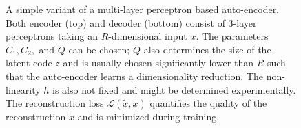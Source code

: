 \documentclass[twoside,11pt,a4paper]{article}
\begin{document}
\begin{figure}
  \caption{A simple variant of a multi-layer perceptron based auto-encoder.
  Both encoder (top) and decoder (bottom) consist of 3-layer perceptrons
  taking an $R$-dimensional
  input $x$. The parameters $C_1, C_2,$ and $Q$ can be chosen; $Q$ also
  determines the size of the latent code $z$ and is usually chosen significantly
  lower than $R$ such that the auto-encoder learns a dimensionality reduction.
  The non-linearity $h$ is also not fixed and might be determined experimentally.
  The reconstruction loss $\mathcal{L}(\tilde{x}, x)$ quantifies the quality of
  the reconstruction $\tilde{x}$ and is minimized during training.}
  \label{subfig:deep-learning-auto-encoder}
\end{figure}
 
\end{document}
